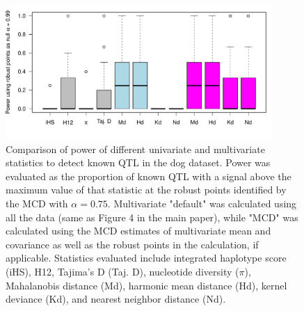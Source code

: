 \documentclass[12pt, oneside]{amsart}
\begin{document}
\newpage
\begin{figure}[h]
\begin{center}
\includegraphics[width=4in]{../figures_man2/S5-DogPower_alpha099.pdf}
\end{center}
\caption[]{Comparison of power of different univariate and multivariate statistics to detect known QTL in the dog dataset. Power was evaluated as the proportion of known QTL with a signal above the maximum value of that statistic at the robust points identified by the MCD with $\alpha=0.75$. Multivariate "default" was calculated using all the data (same as Figure 4 in the main paper), while "MCD" was calculated using the MCD estimates of multivariate mean and covariance as well as the robust points in the calculation, if applicable. Statistics evaluated include integrated haplotype score (iHS), H12, Tajima's D (Taj. D), nucleotide diversity ($\pi$), Mahalanobis distance (Md), harmonic mean distance (Hd), kernel deviance (Kd), and nearest neighbor distance (Nd).} 
 \label{fig:???}
\end{figure}
\end{document}

